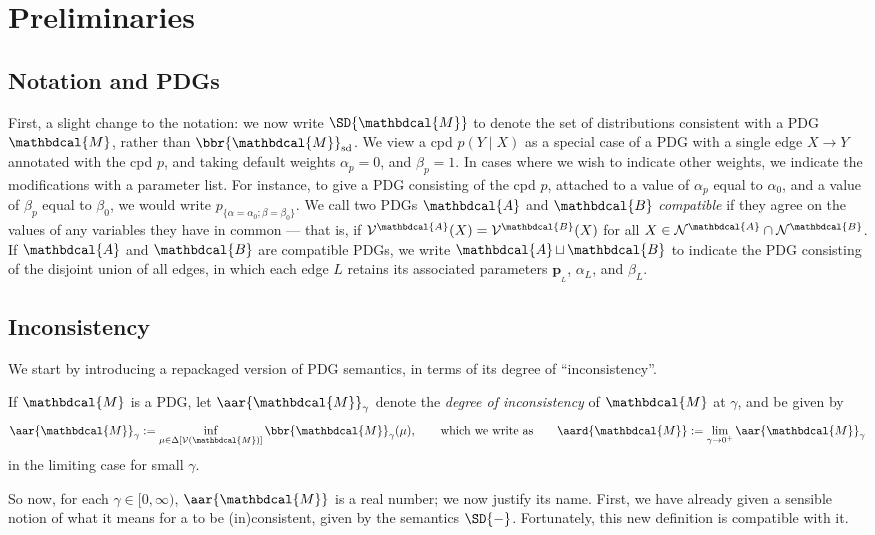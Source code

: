 \documentclass{article}
\theoremstyle{plain}
\theoremstyle{definition}
\theoremstyle{remark}
\let\H\relax
\DeclareMathOperator{\H}{\mathrm{H}} %
\newcommand\mat[1]{\mathbf{#1}}
\newcommand{\thickD}{I\mkern-8muD}
\newcommand{\kldiv}{\thickD\infdivx}
\newcommand{\bp}[1][L]{\mat{p}_{\!_{#1}\!}}
\newcommand{\V}{\mathcal V}
\newcommand{\N}{\mathcal N}
\newcommand{\dg}[1]{\mathbdcal{#1}}
\DeclareMathOperator{\bundle}{\sqcup}
\newcommand{\ed}[3]{%
	\mathchoice%
	{#2\overset{\smash{\mskip-5mu\raisebox{-3pt}{${#1}$}}}{\xrightarrow{\hphantom{\scriptstyle {#1}}}} #3} %
	{#2\overset{\smash{\mskip-5mu\raisebox{-3pt}{$\scriptstyle {#1}$}}}{\xrightarrow{\hphantom{\scriptstyle {#1}}}} #3}%
	{#2\overset{\smash{\mskip-5mu\raisebox{-3pt}{$\scriptscriptstyle {#1}$}}}{\xrightarrow{\hphantom{\scriptscriptstyle {#1}}}} #3} %
	{#2\overset{\smash{\mskip-5mu\raisebox{-3pt}{$\scriptscriptstyle {#1}$}}}{\xrightarrow{\hphantom{\scriptscriptstyle {#1}}}} #3}} %
\newcommand{\alle}[1][L]{_{\ed {#1}XY}}
\begin{document}
\section{Preliminaries}
\subsection*{Notation and PDGs}
First, a slight change to the notation: we now write $\SD{\dg M}$ to denote
the set of distributions consistent with a PDG $\dg M$, rather than $\bbr{\dg M}_{\textrm{sd}}$. We view a cpd $p(Y \mid X)$ as a special case of a PDG with
a single edge $X \to Y$ annotated with the cpd $p$, and taking 
default weights $\alpha_p = 0$, and $\beta_p = 1$. In cases where we wish
to indicate other weights, we indicate the modifications with a parameter
list. For instance, to give a PDG consisting of the cpd $p$, attached to
a value of $\alpha_p$ equal to $\alpha_0$, and 
a value of $\beta_p$ equal to $\beta_0$, we would write
$ p_{\{\alpha=\alpha_0;\beta = \beta_0\}} $.
%
We call two PDGs $\dg A$ and $\dg B$ \emph{compatible} if they agree
on the values of any variables they have in common --- that is, if
$\V^{\dg A}(X) = \V^{\dg B}(X)$ for all $X \in \N^{\dg A} \cap \N^{\dg B}$. 
%
If $\dg A$ and $\dg B$ are compatible PDGs, we write $\dg A \bundle \dg B$ to indicate the PDG consisting of the disjoint union of all edges, in which each edge $L$ retains its associated parameters $\bp$, $\alpha_L$, and $\beta_L$.


\subsection*{Inconsistency}
We start by introducing a repackaged version of PDG semantics,
in terms of its degree of ``inconsistency''.

\begin{defn}
	If $\dg M$ is a PDG, let $\aar{\dg M}_\gamma$ denote the \emph{degree of
	inconsistency} of $\dg M$ at $\gamma$, and be given by
	$$ \aar{\dg M}_\gamma := \inf_{\mu \in \Delta[\V(\dg M)]} 
		\bbr{\dg M}_\gamma(\mu)
		,\qquad\text{which we write as}\qquad
		\aard{\dg M} := \lim_{\gamma\to 0^+} \aar{\dg M}_\gamma
	$$	
	in the limiting case for small $\gamma$.
\end{defn} 

So now, for each $\gamma \in [0, \infty)$, $\aar{\dg M}$ is a real number;
we now justify its name.
First, we have already given a sensible notion of what it means 
for a to be (in)consistent, given by the semantics $\SD{-}$. Fortunately,
this new definition is compatible with it. 
\end{document}
